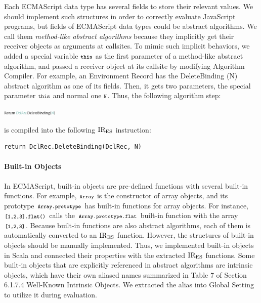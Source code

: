 Each ECMAScript data type has several fields to store their relevant values.
We should implement such structures in order to correctly evaluate JavaScript
programs, but fields of ECMAScript data types could be abstract algorithms.
We call them \textit{method-like abstract algorithms} because they
implicitly get their receiver objects as arguments at callsites.
To mimic such implicit behaviors, we added a special variable
\( \texttt{\footnotesize this} \) as the first parameter of a method-like abstract algorithm,
and passed a receiver object at its callsite by modifying
\textsf{Algorithm Compiler}.  For example, an Environment Record has
the \textsf{DeleteBinding (N)} abstract algorithm as one of its fields.
Then, it gets two parameters, the special parameter \( \texttt{\footnotesize this} \)
and normal one \( \texttt{\footnotesize N} \).  Thus, the following algorithm step:
\begin{center}
  \includegraphics[width=0.2\textwidth]{img/method-like-example.png}
\end{center}
is compiled into the following \( \text{IR}_\text{ES} \) instruction:
\begin{lstlisting}[style=ires]
return DclRec.DeleteBinding(DclRec, N)
\end{lstlisting}

\vspace*{-1em}
\paragraph{Built-in Objects}
In ECMAScript, built-in objects are pre-defined functions with several
built-in functions.  For example, \( \texttt{\footnotesize Array} \)
is the constructor of array objects, and its prototype
\( \texttt{\footnotesize Array.prototype} \) has built-in functions for array objects.
For instance, \( \texttt{\footnotesize[1,2,3].flat()} \) calls the
\( \texttt{\footnotesize Array.prototype.flat} \) built-in function with the array
\( \texttt{\footnotesize[1,2,3]} \).  Because built-in functions are also abstract
algorithms, each of them is automatically converted to an \( \text{IR}_\text{ES} \)
function.  However, the structures of built-in objects should be
manually implemented.  Thus, we implemented built-in objects in Scala
and connected their properties with the extracted \( \text{IR}_\text{ES} \) functions.
%
Some built-in objects that are explicitly referenced in abstract
algorithms are intrinsic objects, which have their own
aliased names summarized in Table 7 of Section 6.1.7.4
\textsf{Well-Known Intrinsic Objects}.  We extracted the alias
into \textsf{Global Setting} to utilize it during evaluation.
